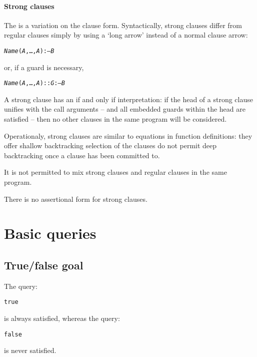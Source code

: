 \paragraph{Strong clauses}
\label{clause:strong}
The  is a variation on the clause form. Syntactically, strong clauses differ from regular clauses simply by using a `long arrow' instead of a normal clause arrow:
\begin{alltt}
\emph{Name}(\emph{A},\ldots,\emph{A\subn}) :-- \emph{B}
\end{alltt}
or, if a guard is necessary,
 \begin{alltt}
\emph{Name}(\emph{A},\ldots,\emph{A\subn})::\emph{G} :-- \emph{B}
\end{alltt}
A strong clause has an if and only if interpretation: if the head of a strong clause unifies with the call arguments -- and all embedded guards within the head are satisfied -- then no other clauses in the same program will be considered.

Operationaly, strong clauses are similar to equations in function definitions: they offer shallow backtracking selection of the clauses do not permit deep backtracking once a clause has been committed to.

It is not permitted to mix strong clauses and regular clauses in the same program.

There is no assertional form for strong clauses. 

\section{Basic queries}
\label{goal:basic}

\subsection{True/false goal}
The query:
\begin{alltt}
true
\end{alltt}
is always satisfied, whereas the query:
\begin{alltt}
false
\end{alltt}
is never satisfied.

